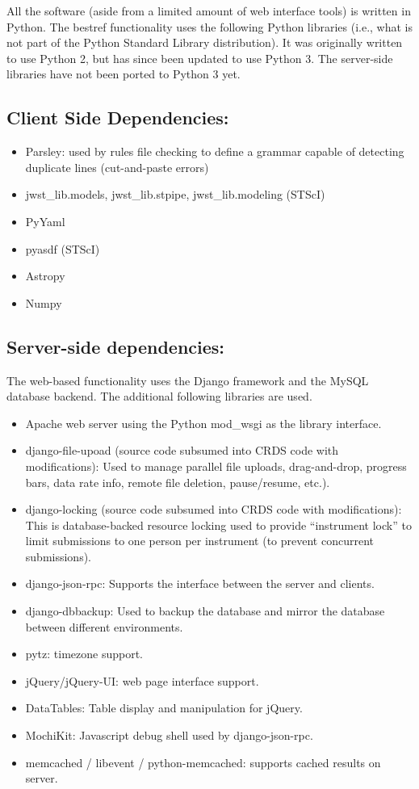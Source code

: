 \documentclass[final,authoryear,5p,times,twocolumn]{elsarticle}
\begin{document}
All the software (aside from a limited amount of web interface tools) is
written in Python. The bestref functionality uses the following Python
libraries (i.e., what is not part of the Python Standard Library
distribution). It was originally written to use Python 2, but has since been
updated to use Python 3. The server-side libraries have not been ported to 
Python 3 yet.

\subsection{Client Side Dependencies:}

\begin{itemize}
\item Parsley: used by rules file checking to define a grammar capable of detecting duplicate lines (cut-and-paste errors)
\item jwst\_lib.models, jwst\_lib.stpipe, jwst\_lib.modeling (STScI)
\item PyYaml
\item pyasdf (STScI)
\item Astropy
\item Numpy

\end{itemize}

\subsection{Server-side dependencies:}

The web-based functionality uses the Django framework and the MySQL database
backend. The additional following libraries are used.

\begin{itemize}
\item Apache web server using the Python mod\_wsgi as the library interface.
\item django-file-upoad (source code subsumed into CRDS code with modifications):
  Used to  manage parallel file uploads, drag-and-drop, progress bars, data rate info,  remote file deletion,  pause/resume,  etc.).
\item django-locking (source code subsumed into CRDS code with modifications):
  This is database-backed resource locking used to provide ``instrument lock''
   to limit submissions to one person per instrument (to prevent concurrent 
   submissions).
\item django-json-rpc: Supports the interface between the server and clients.
\item django-dbbackup: Used to backup the database and mirror the database between
  different environments.
\item pytz: timezone support.
\item jQuery/jQuery-UI: web page interface support.
\item DataTables: Table display and manipulation for jQuery.
\item MochiKit: Javascript debug shell used by django-json-rpc.
\item memcached / libevent / python-memcached: supports cached results on server.
\end{itemize}
\end{document}
